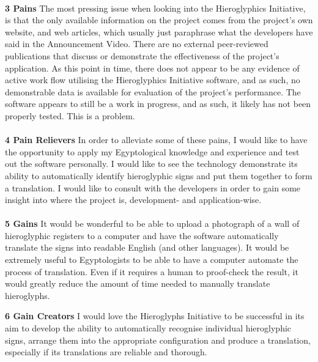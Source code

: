 \documentclass{article}
\begin{document}
\paragraph{} \noindent \break
\textbf{3 Pains}
\newline \break
The most pressing issue when looking into the Hieroglyphics Initiative, is that the only available information on the project comes from the project's own website, and web articles, which usually just paraphrase what the developers have said in the Announcement Video. There are no external peer-reviewed publications that discuss or demonstrate the effectiveness of the project's application.
\newpage \break \noindent
As this point in time, there does not appear to be any evidence of active work flow utilising the Hieroglyphics Initiative software, and as such, no demonstrable data is available for evaluation of the project's performance.
\newline \break
The software appears to still be a work in progress, and as such, it likely has not been properly tested. This is a problem.

\paragraph{} \noindent \break
\textbf{4 Pain Relievers}
\newline \break
In order to alleviate some of these pains, I would like to have the opportunity to apply my Egyptological knowledge and experience and test out the software personally.
\newline \break
I would like to see the technology  demonstrate its ability to automatically identify hieroglyphic signs and put them together to form a translation.
\newline \break
I would like to consult with the developers in order to gain some insight into where the project is, development- and application-wise.

\paragraph{} \noindent \break
\textbf{5 Gains}
\newline \break
It would be wonderful to be able to upload a photograph of a wall of hieroglyphic registers to a computer and have the software automatically translate the signs into readable English (and other languages).
\newline \break
It would be extremely useful to Egyptologists to be able to have a computer automate the process of translation. Even if it requires a human to proof-check the result, it would greatly reduce the amount of time needed to manually translate hieroglyphs.

\newpage \noindent
\textbf{6 Gain Creators}
\newline \break
I would love the Hieroglyphs Initiative to be successful in its aim to develop the ability to automatically recognise individual hieroglyphic signs, arrange them into the appropriate configuration and produce a translation, especially if its translations are reliable and thorough.
\end{document}
